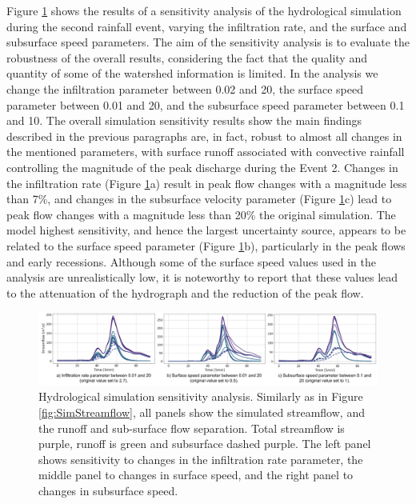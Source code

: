 \documentclass[hess, manuscript]{copernicus}
\begin{document}
Figure \ref{fig:SimStreamflowSA} shows the results of a sensitivity analysis of the hydrological simulation during the second rainfall event, varying the infiltration rate, and the surface and subsurface speed parameters. The aim of the sensitivity analysis is to evaluate the robustness of the overall results, considering the fact that the quality and quantity of some of the watershed information is limited. In the analysis we change the infiltration parameter between 0.02 and 20, the surface speed parameter between 0.01 and 20, and the subsurface speed parameter between 0.1 and 10. The overall simulation sensitivity results show the main findings  described in the previous paragraphs are, in fact, robust to almost all changes in the mentioned parameters, with surface runoff associated with convective rainfall controlling the magnitude of the peak discharge during the Event 2. Changes in the infiltration rate (Figure \ref{fig:SimStreamflowSA}a) result in peak flow changes with a magnitude less than 7\%,  and changes in the subsurface velocity parameter (Figure \ref{fig:SimStreamflowSA}c) lead to peak flow changes with a magnitude less than 20\% the original simulation. The model highest sensitivity, and hence the largest uncertainty source, appears to be related to the surface speed parameter (Figure \ref{fig:SimStreamflowSA}b), particularly in the peak flows and early recessions. Although some of the surface speed values used in the analysis are unrealistically low,  it is noteworthy to report that these values lead to the attenuation of the hydrograph and the reduction of the peak flow. \\

\begin{figure}[t]
\centering
 \includegraphics[width=14cm]{Figures/Parameter_variation_analysis.png}
 \caption{Hydrological simulation sensitivity analysis. Similarly as in Figure \ref{fig:SimStreamflow}, all panels show the simulated streamflow, and the runoff and sub-surface flow separation. Total streamflow is purple, runoff is green and subsurface dashed purple. The left panel shows sensitivity to changes in the infiltration rate  parameter, the middle panel to changes in surface speed, and the right panel to changes in subsurface speed.}
    \label{fig:SimStreamflowSA}
\end{figure}
\end{document}
